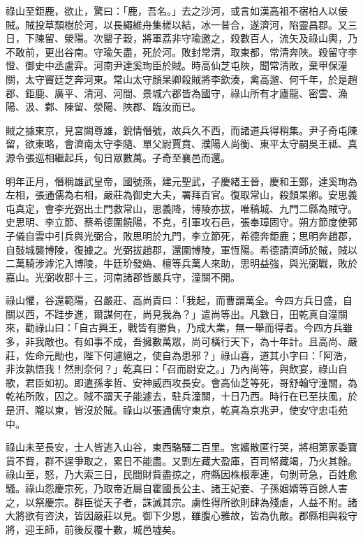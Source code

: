\begin{pinyinscope}
 祿山至鉅鹿，欲止，驚曰：「鹿，吾名。」去之沙河，或言如漢高祖不宿柏人以佞賊。賊投草頹樹於河，以長繩維舟集槎以結，冰一昔合，遂濟河，陷靈昌郡。又三日，下陳留、滎陽。次罌子穀，將軍荔非守瑜邀之，殺數百人，流矢及祿山輿，乃不敢前，更出谷南。守瑜矢盡，死於河。敗封常清，取東都，常清奔陜。殺留守李憕、御史中丞盧弈。河南尹達奚珣臣於賊。時高仙芝屯陜，聞常清敗，棄甲保潼關，太守竇廷芝奔河東。常山太守顏杲卿殺賊將李欽湊，禽高邈、何千年，於是趙郡、鉅鹿、廣平、清河、河間、景城六郡皆為國守，祿山所有才廬龍、密雲、漁陽、汲、鄴、陳留、滎陽、陜郡、臨汝而已。



 賊之據東京，見宮闕尊雄，銳情僭號，故兵久不西，而諸道兵得稍集。尹子奇屯陳留，欲東略，會濟南太守李隨、單父尉賈賁、濮陽人尚衡、東平太守嗣吳王祗、真源令張巡相繼起兵，旬日眾數萬。子奇至襄邑而還。



 明年正月，僭稱雄武皇帝，國號燕，建元聖武，子慶緒王晉，慶和王鄭，達奚珣為左相，張通儒為右相，嚴莊為御史大夫，署拜百官。復取常山，殺顏杲卿。安思義屯真定，會李光弼出土門救常山，思義降，博陵亦拔，唯稿城、九門二縣為賊守。史思明、李立節、蔡希德圍饒陽，不克，引軍攻石邑，張奉璋固守。朔方節度使郭子儀自雲中引兵與光弼合，敗思明於九門，李立節死，希德奔鉅鹿；思明奔趙郡，自鼓城襲博陵，復據之。光弼拔趙郡，還圍博陵，軍恆陽。希德請濟師於賊，賊以二萬騎涉滹沱入博陵，牛廷玠發媯、檀等兵萬人來助，思明益強，與光弼戰，敗於嘉山。光弼收郡十三，河南諸郡皆嚴兵守，潼關不開。



 祿山懼，谷還範陽，召嚴莊、高尚責曰：「我起，而曹謂萬全。今四方兵日盛，自關以西，不跬步進，爾謀何在，尚見我為？」遣尚等出。凡數日，田乾真自潼關來，勸祿山曰：「自古興王，戰皆有勝負，乃成大業，無一舉而得者。今四方兵雖多，非我敵也。有如事不成，吾擁數萬眾，尚可橫行天下，為十年計。且高尚、嚴莊，佐命元勛也，陛下何遽絕之，使自為患邪？」祿山喜，道其小字曰：「阿浩，非汝孰悟我！然則奈何？」乾真曰：「召而尉安之。」乃內尚等，與飲宴，祿山自歌，君臣如初。即遣孫孝哲、安神威西攻長安。會高仙芝等死，哥舒翰守潼關，為乾祐所敗，囚之。賊不謂天子能遽去，駐兵潼關，十日乃西。時行在已至扶風，於是汧、隴以東，皆沒於賊。祿山以張通儒守東京，乾真為京兆尹，使安守忠屯苑中。



 祿山未至長安，士人皆逃入山谷，東西駱驛二百里。宮嬪散匿行哭，將相第家委寶貨不貲，群不逞爭取之，累日不能盡。又剽左藏大盈庫，百司帑藏竭，乃火其餘。祿山至，怒，乃大索三日，民間財貲盡掠之，府縣因株根牽連，句剝苛急，百姓愈騷。祿山怨慶宗死，乃取帝近屬自霍國長公主、諸王妃妾、子孫姻婿等百餘人害之，以祭慶宗。群臣從天子者，誅滅其宗。虜性得所欲則肆為殘虐，人益不附。諸大將欲有咨決，皆因嚴莊以見。御下少恩，雖腹心雅故，皆為仇敵。郡縣相與殺守將，迎王師，前後反覆十數，城邑墟矣。




\end{pinyinscope}
